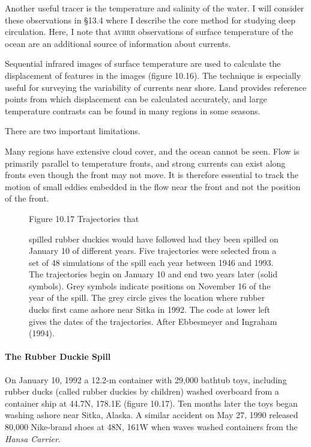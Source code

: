 Another useful tracer is the temperature and salinity of the water. I will
consider these observations in \S 13.4 where I describe the core method
for studying deep circulation. Here, I note that \textsc{avhrr} observations of surface temperature of the ocean are an
additional source of information about currents.

Sequential infrared images of surface temperature are used to calculate the
displacement of features in the images (figure 10.16). The technique is
especially useful for surveying the variability of currents near shore. Land
provides reference points from which displacement can be calculated accurately,
and large temperature contrasts can be found in many regions in some seasons.

There are two important limitations.
\begin{enumerate}
\vitem Many regions have extensive cloud cover, and the ocean cannot be seen.
\vitem Flow is primarily parallel to temperature fronts, and strong currents
can exist along fronts even though the front may not move. It is therefore
essential to track the motion of small eddies embedded in the flow near the front
and not the position of the front.
\end{enumerate}

\begin{figure}[b!]
\vspace{-3ex}
\footnotesize
Figure 10.17 Trajectories that \rule{0mm}{5ex}spilled rubber duckies
would have followed had they been spilled on January 10 of different years. Five
trajectories were selected from a set of 48 simulations of the spill each year
between 1946 and 1993. The trajectories begin on January 10 and end two years
later (solid symbols). Grey symbols indicate positions on November 16 of the year
of the spill. The grey circle gives the location where rubber
ducks first came ashore near Sitka in 1992. The code at lower left gives the dates of the
trajectories. After Ebbesmeyer and Ingraham (1994).
\label{fig:duckies}
\end{figure}

\paragraph{The Rubber Duckie Spill}
On January 10, 1992 a 12.2-m container with 29,000 bathtub
toys, including rubber ducks (called rubber duckies by children) washed overboard from a container ship at 44.7\degrees N, 178.1\degrees E (figure 10.17). Ten months later the toys began washing ashore near Sitka, Alaska. A similar accident on May 27, 1990 released 80,000 Nike-brand shoes at 48\degrees N, 161\degrees W when waves washed containers from the \textit{Hansa Carrier}. 

